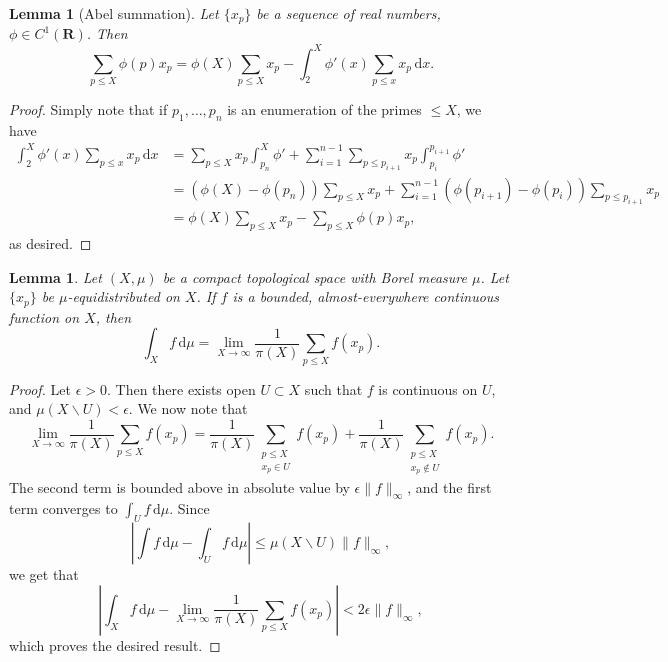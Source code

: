 \documentclass{article}
\newcommand{\bR}{\mathbf{R}}
\newcommand{\dd}{\mathrm{d}}
\newtheorem{lemma}[theorem]{Lemma}
\theoremstyle{definition}
\numberwithin{theorem}{section}
\begin{document}
\begin{lemma}[Abel summation]
Let $\{x_p\}$ be a sequence of real numbers, $\phi\in C^1(\bR)$. Then 
\[
	\sum_{p\leqslant X} \phi(p) x_p = \phi(X) \sum_{p\leqslant X} x_p - \int_2^X \phi'(x) \sum_{p\leqslant x} x_p\, \dd x .
\]
\end{lemma}
\begin{proof}
Simply note that if $p_1,\dots,p_n$ is an enumeration of the primes 
$\leqslant X$, we have 
\begin{align*}
	\int_2^X \phi'(x) \sum_{p\leqslant x} x_p\, \dd x 
		&= \sum_{p\leqslant X} x_p\int_{p_n}^X \phi' + \sum_{i=1}^{n-1} \sum_{p\leqslant p_{i+1}}x_p\int_{p_i}^{p_{i+1}} \phi' \\
		&= (\phi(X)-\phi(p_n))\sum_{p\leqslant X} x_p + \sum_{i=1}^{n-1} (\phi(p_{i+1})-\phi(p_i)) \sum_{p\leqslant p_{i+1}} x_p \\
		&= \phi(X) \sum_{p\leqslant X} x_p - \sum_{p\leqslant X} \phi(p) x_p ,
\end{align*}
as desired.
\end{proof}





\begin{lemma}
Let $(X,\mu)$ be a compact topological space with Borel measure $\mu$. Let 
$\{x_p\}$ be $\mu$-equidistributed on $X$. If $f$ is a bounded, 
almost-everywhere continuous function on $X$, then 
\[
	\int_X f\, \dd \mu = \lim_{X\to \infty} \frac{1}{\pi(X)} \sum_{p\leqslant X} f(x_p) .
\]
\end{lemma}
\begin{proof}
Let $\epsilon>0$. Then there exists open $U\subset X$ such that $f$ is 
continuous on $U$, and $\mu(X\smallsetminus U)<\epsilon$. We now note that 
\[
	\lim_{X\to \infty} \frac{1}{\pi(X)} \sum_{p\leqslant X} f(x_p)
		= \frac{1}{\pi(X)} \sum_{\substack{p\leqslant X \\ x_p\in U}} f(x_p) + \frac{1}{\pi(X)} \sum_{\substack{p\leqslant X \\ x_p\notin U}} f(x_p) .
\]
The second term is bounded above in absolute value by $\epsilon  \|f\|_\infty$, 
and the first term converges to $\int_U f\, \dd\mu$. Since 
\[
	\left|\int f\, \dd\mu - \int_U f\, \dd\mu\right| \leqslant \mu(X\smallsetminus U)\|f\|_\infty ,
\]
we get that 
\[
	\left|\int_X f\, \dd \mu - \lim_{X\to \infty} \frac{1}{\pi(X)} \sum_{p\leqslant X} f(x_p)\right| < 2\epsilon \|f\|_\infty ,
\]
which proves the desired result.
\end{proof}





\printbibliography
\end{document}
